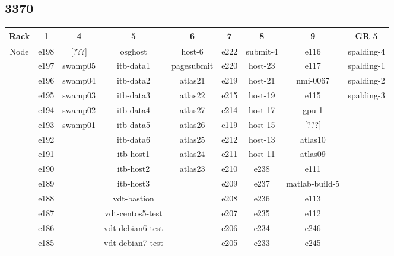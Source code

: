 \documentclass[10pt,letterpaper]{article}
\begin{document}
    \subsection{3370}
        \begin{center}
        \begin{tabular}{ |c|c|c|c|c|c|c|c|c| }
        \hline
        Rack & 1 & 4 & 5 & 6 & 7 & 8 & 9 & GR 5 \\
        \hline
        \multirow{1}{3em}{Node}

        & e198 & [???]   & osghost          & host-6     & e222    & submit-4 & e116           & spalding-4 \\
        & e197 & swamp05 & itb-data1        & pagesubmit & e220    & host-23  & e117           & spalding-1 \\
        & e196 & swamp04 & itb-data2        & atlas21    & e219    & host-21  & nmi-0067       & spalding-2 \\
        & e195 & swamp03 & itb-data3        & atlas22    & e215    & host-19  & e115           & spalding-3 \\
        & e194 & swamp02 & itb-data4        & atlas27    & e214    & host-17  & gpu-1          &            \\
        & e193 & swamp01 & itb-data5        & atlas26    & e119    & host-15  & [???]          &            \\
        & e192 &         & itb-data6        & atlas25    & e212    & host-13  & atlas10        &            \\
        & e191 &         & itb-host1        & atlas24    & e211    & host-11  & atlas09        &            \\
        & e190 &         & itb-host2        & atlas23    & e210    & e238     & e111           &            \\
        & e189 &         & itb-host3        &            & e209    & e237     & matlab-build-5 &            \\
        & e188 &         & vdt-bastion      &            & e208    & e236     & e113           &            \\
        & e187 &         & vdt-centos5-test &            & e207    & e235     & e112           &            \\
        & e186 &         & vdt-debian6-test &            & e206    & e234     & e246           &            \\
        & e185 &         & vdt-debian7-test &            & e205    & e233     & e245           &            \\

\end{tabular}
\end{center}
\end{document}
